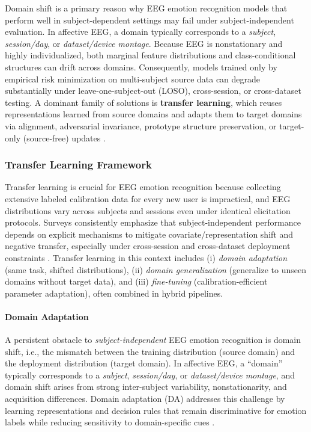 \documentclass{WileyMSP-template}
\begin{document}
Domain shift is a primary reason why EEG emotion recognition models that perform well in subject-dependent settings may fail under subject-independent evaluation. In affective EEG, a domain typically corresponds to a \emph{subject}, \emph{session/day}, or \emph{dataset/device montage}. Because EEG is nonstationary and highly individualized, both marginal feature distributions and class-conditional structures can drift across domains. Consequently, models trained only by empirical risk minimization on multi-subject source data can degrade substantially under leave-one-subject-out (LOSO), cross-session, or cross-dataset testing. A dominant family of solutions is \textbf{transfer learning}, which reuses representations learned from source domains and adapts them to target domains via alignment, adversarial invariance, prototype structure preservation, or target-only (source-free) updates \cite{wu2020tleeegbci,wan2021tleeegsurvey,li2022transferreview,wu2022tcds_tl_bci_review,wan2021neucom_transferreview,li2022tcds_emotiontransfer_review,wang2024csur_researchprogress}.

\subsubsection{Transfer Learning Framework}
\label{sec:transfer_learning_framework}

Transfer learning is crucial for EEG emotion recognition because collecting extensive labeled calibration data for every new user is impractical, and EEG distributions vary across subjects and sessions even under identical elicitation protocols. Surveys consistently emphasize that subject-independent performance depends on explicit mechanisms to mitigate covariate/representation shift and negative transfer, especially under cross-session and cross-dataset deployment constraints \cite{apicella2024neucom_systematic,wang2024csur_researchprogress,li2022tcds_emotiontransfer_review}. Transfer learning in this context includes (i) \emph{domain adaptation} (same task, shifted distributions), (ii) \emph{domain generalization} (generalize to unseen domains without target data), and (iii) \emph{fine-tuning} (calibration-efficient parameter adaptation), often combined in hybrid pipelines.

\paragraph{Domain Adaptation}
A persistent obstacle to \emph{subject-independent} EEG emotion recognition is domain shift, i.e., the mismatch between the training distribution (source domain) and the deployment distribution (target domain). In affective EEG, a ``domain'' typically corresponds to a \emph{subject}, \emph{session/day}, or \emph{dataset/device montage}, and domain shift arises from strong inter-subject variability, nonstationarity, and acquisition differences. Domain adaptation (DA) addresses this challenge by learning representations and decision rules that remain discriminative for emotion labels while reducing sensitivity to domain-specific cues \cite{ganin2016dann,gretton2012kernel,sun2016deepcoral}.
\end{document}
